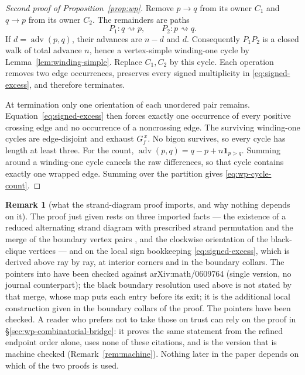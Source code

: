 \documentclass[11pt]{article}
\theoremstyle{definition}
\newtheorem{remark}[theorem]{Remark}
\begin{document}
\begin{proof}[Second proof of Proposition~\ref{prop:wp}]
Remove $p\to q$ from its owner $C_1$ and $q\to p$ from its owner $C_2$.  The
remainders are paths
\[
   P_1:q\rightsquigarrow p,
   \qquad P_2:p\rightsquigarrow q.
\]
If $d=\operatorname{adv}(p,q)$, their advances are $n-d$ and $d$.
Consequently $P_1P_2$ is a closed walk of total advance $n$, hence a
vertex-simple winding-one cycle by Lemma~\ref{lem:winding-simple}.  Replace $C_1,C_2$ by
this cycle.  Each operation removes two edge occurrences, preserves every
signed multiplicity in \eqref{eq:signed-excess}, and therefore terminates.

At termination only one orientation of each unordered pair remains.
Equation~\eqref{eq:signed-excess} then forces exactly one occurrence of every
positive crossing edge and no occurrence of a noncrossing edge.  The surviving
winding-one cycles are edge-disjoint and exhaust $G_f^{\,x}$.  No bigon survives,
so every cycle has length at least three.
For the count, $\operatorname{adv}(p,q)=q-p+n\mathbf1_{p>q}$.
Summing around a winding-one cycle cancels the raw differences, so that cycle
contains exactly one wrapped edge. Summing over the partition gives
\eqref{eq:wp-cycle-count}.
\end{proof}

\begin{remark}[what the strand-diagram proof imports, and why nothing depends on it]\label{rem:wp-imports}
The proof just given rests on three imported facts --- the existence of a reduced alternating strand
diagram with prescribed strand permutation and the merge of the boundary vertex pairs
\cite[Lem.~14.6, Cor.~14.7 with Cor.~14.2; the map $T\mapsto D$ following Def.~14.3, and Lem.~14.4]{Postnikov},
and the clockwise orientation of the black-clique
vertices \cite[Rem.~9.6, with Thm.~9.12 and the two remarks after it]{OPS} --- and on the local sign
bookkeeping \eqref{eq:signed-excess}, which is derived above ray by ray, at interior corners and in the
boundary collars. The pointers into
\cite{Postnikov} have been checked against arXiv:math/0609764 (single version, no journal counterpart);
the black boundary resolution used above is not stated by that merge, whose map puts each entry before its
exit; it is the additional local construction given in the boundary collars of the proof. The \cite{OPS}
pointers have been checked. A reader who prefers not
to take those on trust can rely on the proof in \S\ref{sec:wp-combinatorial-bridge}: it proves the same
statement from the refined endpoint order alone, uses none of these citations, and is the version that is
machine checked (Remark~\ref{rem:machine}). Nothing later in the paper depends on which of the two proofs is
used.
\end{remark}
\end{document}
